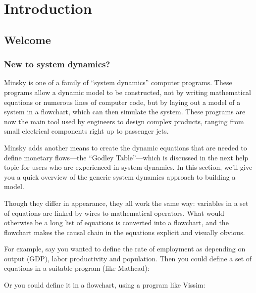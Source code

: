 \chapter{Introduction}
\label{Introduction}

\section{Welcome}

\subsection{New to system dynamics?}
\label{intro:new}

Minsky is one of a family of ``system dynamics'' computer
programs. These programs allow a dynamic model to be constructed, not
by writing mathematical equations or numerous lines of computer code,
but by laying out a model of a system in a flowchart, which can then
simulate the system. These programs are now the main tool used by
engineers to design complex products, ranging from small electrical
components right up to passenger jets.


Minsky adds another means to create the dynamic equations that are
needed to define monetary flows---the ``Godley Table''---which is
discussed in the next help topic for users who are experienced in
system dynamics. In this section, we'll give you a quick overview of
the generic system dynamics approach to building a model.


Though they differ in appearance, they all work the same way:
variables in a set of equations are linked by wires to mathematical
operators. What would otherwise be a long list of equations is
converted into a flowchart, and the flowchart makes the causal chain
in the equations explicit and visually obvious.

For example, say you wanted to define the rate of employment as
depending on output (GDP), labor productivity and population. Then you
could define a set of equations in a suitable program (like Mathcad):

\begin{center}
\end{center}

Or you could define it in a flowchart, using a program like Vissim:

\begin{center}
\end{center}

